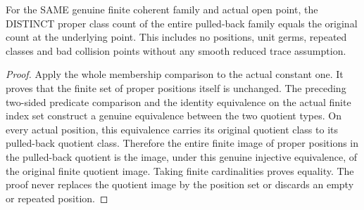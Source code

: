 \begin{theorem}
\label{hir:sharp-actual-distinct-proper-count-open}
\leanok
For the SAME genuine finite coherent family and actual open point, the DISTINCT
proper class count of the entire pulled-back family equals the original count
at the underlying point. This includes no positions, unit germs, repeated
classes and bad collision points without any smooth reduced trace assumption.
\end{theorem}
\begin{proof}
Apply the whole membership comparison to the actual constant one. It proves
that the finite set of proper positions itself is unchanged. The preceding
two-sided predicate comparison and the identity equivalence on the actual
finite index set construct a genuine equivalence between the two quotient
types. On every actual position, this equivalence carries its original quotient
class to its pulled-back quotient class. Therefore the entire finite image of
proper positions in the pulled-back quotient is the image, under this genuine
injective equivalence, of the original finite quotient image. Taking finite
cardinalities proves equality. The proof never replaces the quotient image
by the position set or discards an empty or repeated position.
\end{proof}

